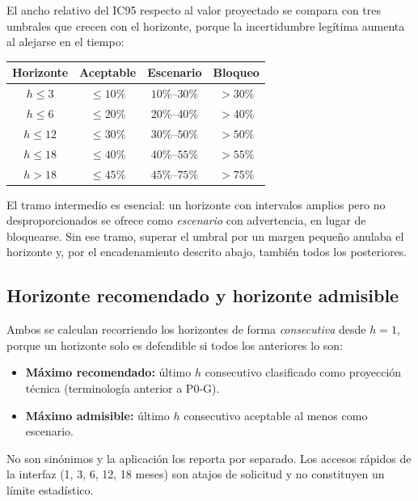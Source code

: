 \documentclass[11pt,letterpaper]{article}
\begin{document}
El ancho relativo del IC95 respecto al valor proyectado se compara con tres
umbrales que crecen con el horizonte, porque la incertidumbre legítima aumenta
al alejarse en el tiempo:

\begin{center}
\begin{tabular}{@{}cccc@{}}
\toprule
\textbf{Horizonte} & \textbf{Aceptable} & \textbf{Escenario} & \textbf{Bloqueo} \\
\midrule
\(h\leq 3\)  & \(\leq 10\%\) & \(10\%\)--\(30\%\) & \(>30\%\) \\
\(h\leq 6\)  & \(\leq 20\%\) & \(20\%\)--\(40\%\) & \(>40\%\) \\
\(h\leq 12\) & \(\leq 30\%\) & \(30\%\)--\(50\%\) & \(>50\%\) \\
\(h\leq 18\) & \(\leq 40\%\) & \(40\%\)--\(55\%\) & \(>55\%\) \\
\(h> 18\)    & \(\leq 45\%\) & \(45\%\)--\(75\%\) & \(>75\%\) \\
\bottomrule
\end{tabular}
\end{center}

El tramo intermedio es esencial: un horizonte con intervalos amplios pero no
desproporcionados se ofrece como \emph{escenario} con advertencia, en lugar de
bloquearse. Sin ese tramo, superar el umbral por un margen pequeño anulaba el
horizonte y, por el encadenamiento descrito abajo, también todos los
posteriores.

\subsection{Horizonte recomendado y horizonte admisible}

Ambos se calculan recorriendo los horizontes de forma \emph{consecutiva} desde
\(h=1\), porque un horizonte solo es defendible si todos los anteriores lo son:

\begin{itemize}
  \item \textbf{Máximo recomendado:} último \(h\) consecutivo clasificado como proyección técnica (terminología anterior a P0-G).
  \item \textbf{Máximo admisible:} último \(h\) consecutivo aceptable al menos como escenario.
\end{itemize}

No son sinónimos y la aplicación los reporta por separado. Los accesos rápidos
de la interfaz (1, 3, 6, 12, 18 meses) son atajos de solicitud y no constituyen
un límite estadístico.
\end{document}
